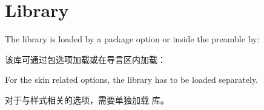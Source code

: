 \section{Library }\label{sec:hooks}%
%
The library is loaded by a package option or inside the preamble by:

该库可通过包选项加载或在导言区内加载：
\begin{dispListing}
\end{dispListing}

For the skin related options, the library  has to be loaded
separately.

对于与样式相关的选项，需要单独加载  库。